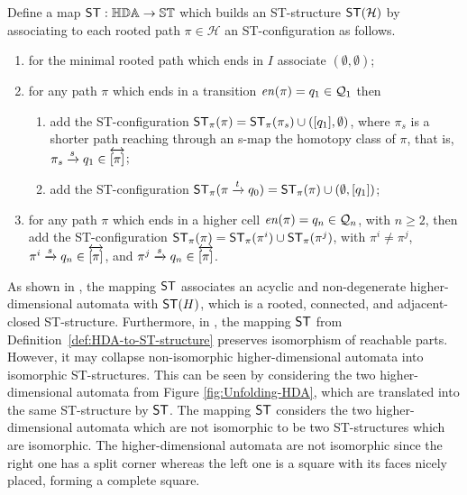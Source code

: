     \begin{definition}
        \label{def:HDA-to-ST-structure}
         Define a map $\mathsf{ST}:\mathbb{HDA} \rightarrow \mathbb{ST}$ which builds an ST-structure $\mathsf{ST}(\mathcal{H})$ by associating to each rooted path $\pi\in \mathcal{H}$ an ST-configuration as follows.

        \begin{enumerate}
            \item\label{hintost_1} for the minimal rooted path which ends in $I$ associate $(\emptyset,\emptyset)$;
            \item\label{hintost_2} for any path $\pi$ which ends in a transition $\mathit{en}(\pi)=q_{1}\in \mathcal{Q}_{1}$ then 
        
            \begin{enumerate}
                \item\label{hintost_21} add the ST-configuration $\hintost(\pi)=\hintost(\pi_{s})\cup(\equivClass{q_{1}},\emptyset)$, where $\pi_{s}$ is a shorter path reaching through an s-map the homotopy class of $\pi$, that is, $\pi_{s}\xrightarrow{s}q_{1}\in\overleftrightarrow{[\pi]}$;
                \item\label{hintost_22} add the ST-configuration $\hintost(\pi\transition{t}q_{0})=\hintost(\pi)\cup(\emptyset,\equivClass{q_{1}})$;
            \end{enumerate}

            \item\label{hintost_3} for any path $\pi$ which ends in a higher cell $\mathit{en}(\pi)=q_{n}\in \mathcal{Q}_{n}$, with $n\geq 2$, then add the ST-configuration $\mathsf{ST}_{\pi}(\pi)=\mathsf{ST}_{\pi}(\pi^{i})\cup\mathsf{ST}_{\pi}(\pi^{j})$, with $\pi^{i}\neq\pi^{j}$, $\pi^{i}\xrightarrow{s}q_{n}\in\overleftrightarrow{[\pi]}$, and $\pi^{j}\xrightarrow{s}q_{n}\in\overleftrightarrow{[\pi]}$.
        \end{enumerate}
    \end{definition}

    As shown in \cite[Proposition 3.42]{Johansen16STstruct}, the mapping $\mathsf{ST}$ associates an acyclic and non-degenerate higher-dimensional automata with $\mathsf{ST}(H)$, which is a rooted, connected, and adjacent-closed ST-structure. Furthermore, in \cite[Proposition 3.44]{Johansen16STstruct}, the mapping $\mathsf{ST}$ from Definition~\ref{def:HDA-to-ST-structure} preserves isomorphism of reachable parts. However, it may collapse non-isomorphic higher-dimensional automata into isomorphic ST-structures. This can be seen by considering the two higher-dimensional automata from Figure \ref{fig:Unfolding-HDA}, which are translated into the same ST-structure by $\mathsf{ST}$. The mapping $\mathsf{ST}$ considers the two higher-dimensional automata which are not isomorphic to be two ST-structures which are isomorphic. The higher-dimensional automata are not isomorphic since the right one has a split corner whereas the left one is a square with its faces nicely placed, forming a complete square. 
        
